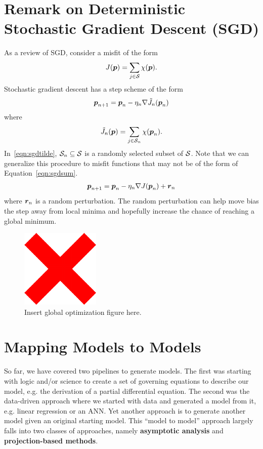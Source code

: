\section{Remark on Deterministic Stochastic Gradient Descent (SGD)}
As a review of SGD, consider a misfit of the form
\begin{align} \label{eqn:sgdsum}
J(\boldsymbol{p}) = \sum_{j \in \mathcal{S}} \chi(\boldsymbol{p}).
\end{align}
Stochastic gradient descent has a step scheme of the form
\begin{align} \label{eqn:sgdstep}
    \boldsymbol{p}_{n+1} = \boldsymbol{p}_{n} - \eta_{n} \nabla \tilde{J}_{n}(\boldsymbol{p}_{n})
\end{align}
where 
\begin{align} \label{eqn:sgdtilde}
    \tilde{J}_{n}(\boldsymbol{p}) = \sum_{j \in \mathcal{S}_{n}} \chi(\boldsymbol{p}_{n}).
\end{align}
In~\ref{eqn:sgdtilde}, $\mathcal{S}_{n} \subseteq \mathcal{S}$ is a randomly selected subset of $\mathcal{S}$. Note that we can generalize this procedure to misfit functions that may not be of the form of Equation~\ref{eqn:sgdsum}. 
\begin{align}
    \boldsymbol{p}_{n+1} = \boldsymbol{p}_{n} - \eta_{n} \nabla J(\boldsymbol{p}_{n}) + \boldsymbol{r}_{n}
\end{align}
where $\boldsymbol{r}_{n}$ is a random perturbation. The random perturbation can help move bias the step away from local minima and hopefully increase the chance of reaching a global minimum. 

\begin{figure}
    \centering
    \includegraphics{images/x.pdf}
    \caption{Insert global optimization figure here.}
    \label{fig:sgddeterministic}
\end{figure}

\section{Mapping Models to Models}
So far, we have covered two pipelines to generate models. 
The first was starting with logic and/or science to create a set of governing equations to describe our model, e.g. the derivation of a partial differential equation. 
The second was the data-driven approach where we started with data and generated a model from it, e.g. linear regression or an ANN. Yet another approach is to generate another model given an original starting model. This ``model to model'' approach largely falls into two classes of approaches, namely \textbf{asymptotic analysis} and \textbf{projection-based methods}. 

